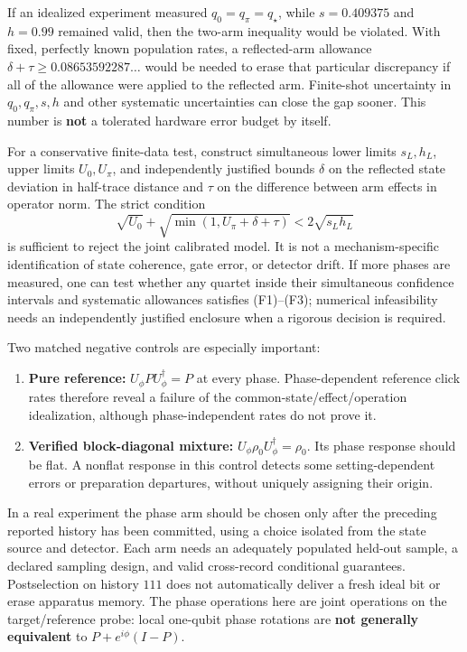 \documentclass[
  10pt,
  a4paper,
]{article}
\providecommand{\tightlist}{%
  \setlength{\itemsep}{0pt}\setlength{\parskip}{0pt}}
\begin{document}
If an idealized experiment measured \(q_0=q_\pi=q_\star\), while \(s=0.409375\) and \(h=0.99\) remained valid, then the two-arm inequality would be violated. With fixed, perfectly known population rates, a reflected-arm allowance \(\delta+\tau\ge0.08653592287\ldots\) would be needed to erase that particular discrepancy if all of the allowance were applied to the reflected arm. Finite-shot uncertainty in \(q_0,q_\pi,s,h\) and other systematic uncertainties can close the gap sooner. This number is \textbf{not} a tolerated hardware error budget by itself.

For a conservative finite-data test, construct simultaneous lower limits \(s_L,h_L\), upper limits \(U_0,U_\pi\), and independently justified bounds \(\delta\) on the reflected state deviation in half-trace distance and \(\tau\) on the difference between arm effects in operator norm. The strict condition \[
\sqrt{U_0}+\sqrt{\min(1,U_\pi+\delta+\tau)}<2\sqrt{s_Lh_L}
\] is sufficient to reject the joint calibrated model. It is not a mechanism-specific identification of state coherence, gate error, or detector drift. If more phases are measured, one can test whether any quartet inside their simultaneous confidence intervals and systematic allowances satisfies (F1)--(F3); numerical infeasibility needs an independently justified enclosure when a rigorous decision is required.

Two matched negative controls are especially important:

\begin{enumerate}
\def\labelenumi{\arabic{enumi}.}
\tightlist
\item
  \textbf{Pure reference:} \(U_\phi P U_\phi^\dagger=P\) at every phase. Phase-dependent reference click rates therefore reveal a failure of the common-state/effect/operation idealization, although phase-independent rates do not prove it.
\item
  \textbf{Verified block-diagonal mixture:} \(U_\phi\rho_0 U_\phi^\dagger=\rho_0\). Its phase response should be flat. A nonflat response in this control detects some setting-dependent errors or preparation departures, without uniquely assigning their origin.
\end{enumerate}

In a real experiment the phase arm should be chosen only after the preceding reported history has been committed, using a choice isolated from the state source and detector. Each arm needs an adequately populated held-out sample, a declared sampling design, and valid cross-record conditional guarantees. Postselection on history \(111\) does not automatically deliver a fresh ideal bit or erase apparatus memory. The phase operations here are joint operations on the target/reference probe: local one-qubit phase rotations are \textbf{not generally equivalent} to \(P+e^{i\phi}(I-P)\).
\end{document}

